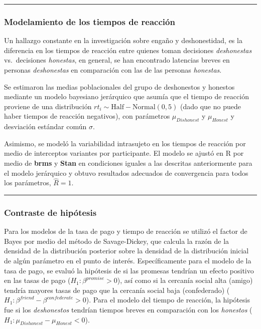 \documentclass[12pt,]{article}
\begin{document}
\begin{center}\rule{0.5\linewidth}{\linethickness}\end{center}

\subsubsection{Modelamiento de los tiempos de
reacción}\label{modelamiento-de-los-tiempos-de-reaccion}

Un hallazgo constante en la investigación sobre engaño y deshonestidad,
es la diferencia en los tiempos de reacción entre quienes toman
decisiones \emph{deshonestas} vs.~decisiones \emph{honestas}, en
general, se han encontrado latencias breves en personas
\emph{deshonestas} en comparación con las de las personas
\emph{honestas}.

Se estimaron las medias poblacionales del grupo de deshonestos y
honestos mediante un modelo bayesiano jerárquico que asumía que el
tiempo de reacción proviene de una distribución
\(rt_i \sim \mathrm{Half-Normal}(0, 5)\) (dado que no puede haber
tiempos de reacción negativos), con parámetros \(\mu_{Dishonest}\) y
\(\mu_{Honest}\) y desviación estándar común \(\sigma\).

Asimismo, se modeló la variabilidad intrasujeto en los tiempos de
reacción por medio de interceptos variantes por participante. El modelo
se ajustó en R por medio de \textbf{brms} y \textbf{Stan} en condiciones
iguales a las descritas anteriormente para el modelo jerárquico y obtuvo
resultados adecuados de convergencia para todos los parámetros,
\(\hat{R} = 1\).

\begin{center}\rule{0.5\linewidth}{\linethickness}\end{center}

\subsubsection{Contraste de hipótesis}\label{contraste-de-hipotesis}

Para los modelos de la tasa de pago y tiempo de reacción se utilizó el
factor de Bayes por medio del método de Savage-Dickey, que calcula la
razón de la densidad de la distribución posterior sobre la densidad de
la distribución inicial de algún parámetro en el punto de interés.
Específicamente para el modelo de la tasa de pago, se evaluó la
hipótesis de si las promesas tendrían un efecto positivo en las tasas de
pago (\(H_1: \beta^{promise} > 0\)), así como si la cercanía social alta
(amigo) tendría mayores tasas de pago que la cercanía social baja
(confederado) (\(H_1: \beta^{friend} - \beta^{confederate} > 0\)). Para
el modelo del tiempo de reacción, la hipótesis fue si los
\emph{deshonestos} tendrían tiempos breves en comparación con los
\emph{honestos} (\(H_1: \mu_{Dishonest} - \mu_{Honest} < 0\)).
\end{document}

